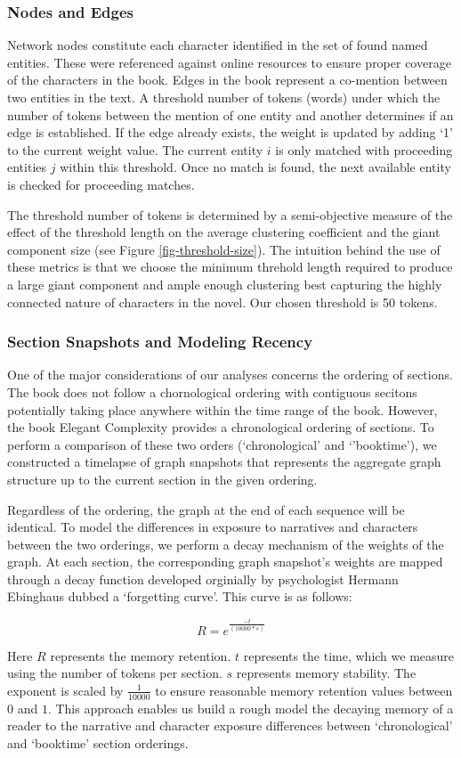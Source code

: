\subsubsection{Nodes and Edges}
Network nodes constitute each character identified in the set of found named entities. These were referenced against online resources to ensure proper coverage of the characters in the book. Edges in the book represent a co-mention between two entities in the text. A threshold number of tokens (words) under which the number of tokens between the mention of one entity and another determines if an edge is established. If the edge already exists, the weight is updated by adding `1' to the current weight value. The current entity $i$ is only matched with proceeding entities $j$ within this threshold. Once no match is found, the next available entity is checked for proceeding matches.

The threshold number of tokens is determined by a semi-objective measure of the effect of the threshold length on the average clustering coefficient and the giant component size (see Figure \ref{fig-threshold-size}). The intuition behind the use of these metrics is that we choose the minimum threhold length required to produce a large giant component and ample enough clustering best capturing the highly connected nature of characters in the novel. Our chosen threshold is 50 tokens.

\subsubsection{Section Snapshots and Modeling Recency}
One of the major considerations of our analyses concerns the ordering of sections. The book does not follow a chornological ordering with contiguous secitons potentially taking place anywhere within the time range of the book. However, the book Elegant Complexity \cite{carlisle_2007} provides a chronological ordering of sections. To perform a comparison of these two orders (`chronological' and `'booktime'), we constructed a timelapse of graph snapshots that represents the aggregate graph structure up to the current section in the given ordering. 

Regardless of the ordering, the graph at the end of each sequence will be identical. To model the differences in exposure to narratives and characters between the two orderings, we perform a decay mechanism of the weights of the graph. At each section, the corresponding graph snapshot's weights are mapped through a decay function developed orginially by psychologist Hermann Ebinghaus dubbed a `forgetting curve'. This curve is as follows:


\begin{equation}
    R = e^{\frac{-t}{(10000*s)}}
\end{equation}


Here $R$ represents the memory retention. $t$ represents the time, which we measure using the number of tokens per section. $s$ represents memory stability. The exponent is scaled by $\frac{1}{10000}$ to ensure reasonable memory retention values between $0$ and $1$. This approach enables us build a rough model the decaying memory of a reader to the narrative and character exposure differences between `chronological' and `booktime' section orderings.
